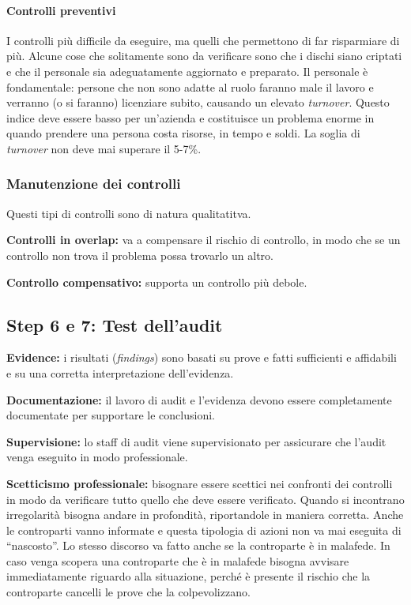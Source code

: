 \paragraph*{Controlli preventivi} I controlli più difficile da eseguire, ma 
quelli che permettono di far risparmiare di più. Alcune cose che solitamente 
sono da verificare sono che i dischi siano criptati e che il 
personale sia adeguatamente aggiornato e preparato.
Il personale è fondamentale: persone che non sono adatte al ruolo faranno male 
il lavoro e verranno (o si faranno) licenziare subito, causando un 
elevato \textit{turnover}. Questo indice deve essere basso per un'azienda e 
costituisce un problema enorme in quando prendere una persona costa risorse, in 
tempo e soldi. La soglia di \textit{turnover} non deve mai superare il 5-7\%.

\subsubsection{Manutenzione dei controlli}

Questi tipi di controlli sono di natura qualitatitva.

\textbf{Controlli in overlap:} va a compensare il rischio di controllo, in modo che se 
un controllo non trova il problema possa trovarlo un altro.

\textbf{Controllo compensativo:} supporta un controllo più debole.

\subsection{Step 6 e 7: Test dell'audit}


\textbf{Evidence:} i risultati (\emph{findings}) sono basati su prove e fatti 
sufficienti e affidabili e su una corretta interpretazione dell'evidenza. 

\textbf{Documentazione:} il lavoro di audit e l'evidenza 
devono essere completamente documentate per supportare le conclusioni.

\textbf{Supervisione:} lo staff di audit viene supervisionato per assicurare che l'audit 
venga eseguito in modo professionale.

\textbf{Scetticismo professionale:} bisognare essere scettici nei confronti dei 
controlli in modo da verificare tutto quello che deve essere verificato.
Quando si incontrano irregolarità bisogna andare in profondità, riportandole 
in maniera corretta. Anche le controparti vanno informate e questa tipologia di 
azioni non va mai eseguita di ``nascosto''. Lo stesso discorso va fatto anche 
se la controparte è in malafede. In caso venga scopera una controparte che è in 
malafede bisogna avvisare immediatamente riguardo alla situazione, perché è 
presente il rischio che la controparte cancelli le prove che la colpevolizzano.

